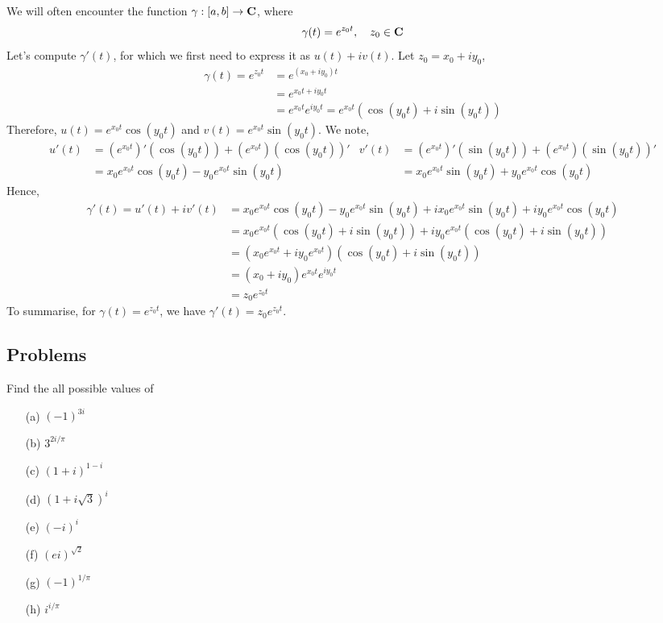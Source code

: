 \vspace*{1em}

\begin{example}
We will often encounter the function $\gamma:[a,b] \to \mathbf C$, where
\[\gamma(t) = e^{z_0t},\quad z_0 \in \mathbf C\]
Let's compute $\gamma'(t)$, for which we first need to express it as $u(t) + iv(t)$. Let $z_0 = x_0 + iy_0$,
\begin{align*}
\gamma(t) = e^{z_0t} &= e^{(x_0 + iy_0)t}\\[0.5em]
&= e^{x_0t + iy_0t}\\[0.5em]
&= e^{x_0t}e^{iy_0t} = e^{x_0t}(\cos(y_0t) + i\sin(y_0t))
\end{align*}
Therefore, $u(t) = e^{x_0t}\cos(y_0t)$ and $v(t) = e^{x_0t}\sin(y_0t)$. We note,
\begin{align*}
u'(t) &= (e^{x_0t})'(\cos(y_0t)) + (e^{x_0t})(\cos(y_0t))' & v'(t) &= (e^{x_0t})'(\sin(y_0t)) + (e^{x_0t})(\sin(y_0t))'\\[0.5em]
 &= x_0e^{x_0t}\cos(y_0t) - y_0e^{x_0t}\sin(y_0t) & &= x_0e^{x_0t}\sin(y_0t) + y_0e^{x_0t}\cos(y_0t)
\end{align*}
Hence, 
\begin{align*}
\gamma'(t) = u'(t) + iv'(t) &= x_0e^{x_0t}\cos(y_0t) - y_0e^{x_0t}\sin(y_0t) + ix_0e^{x_0t}\sin(y_0t) + iy_0e^{x_0t}\cos(y_0t)\\[0.5em]
&= x_0e^{x_0t}(\cos(y_0t) + i\sin(y_0t)) + iy_0e^{x_0t}(\cos(y_0t) + i\sin(y_0t))\\[0.5em]
&= (x_0e^{x_0t} + iy_0e^{x_0t})(\cos(y_0t) + i\sin(y_0t))\\[0.5em]
&= (x_0 + iy_0)e^{x_0t}e^{iy_0t}\\[0.5em]
&= z_0e^{z_0t}
\end{align*}
To summarise, for $\gamma(t) = e^{z_0t}$, we have $\gamma'(t) = z_0e^{z_0t}$.
\end{example}
\vspace*{2em}

\subsection{Problems}
\vspace{0.1in}


\begin{problem}\label{prob 10.1}
Find the all possible values of
\begin{multicols}{2}
\begin{itemize}
\item[(a)] $(-1)^{3i}$
\item[(b)] $3^{2i/\pi}$
\item[(c)] $(1 + i)^{1-i}$
\item[(d)] $(1+i\sqrt{3})^i$
\item[(e)] $(-i)^i$
\item[(f)] $(ei)^{\sqrt{2}}$
\item[(g)] $(-1)^{1/\pi}$
\item[(h)] $i^{i/\pi}$
\end{itemize}
\end{multicols}
\end{problem}

